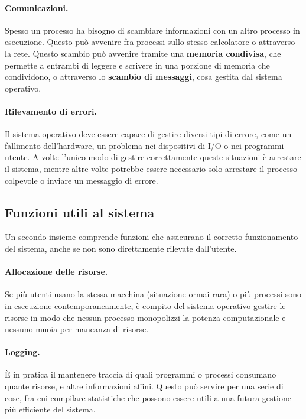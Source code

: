         \paragraph{Comunicazioni.} Spesso un processo ha bisogno di scambiare informazioni con un altro processo in esecuzione. Questo può avvenire fra processi sullo stesso calcolatore o attraverso la rete. Questo scambio può avvenire tramite una \textbf{memoria condivisa}, che permette a entrambi di leggere e scrivere in una porzione di memoria che condividono, o attraverso lo \textbf{scambio di messaggi}, cosa gestita dal sistema operativo.
        
        \paragraph{Rilevamento di errori.} Il sistema operativo deve essere capace di gestire diversi tipi di errore, come un fallimento dell'hardware, un problema nei dispositivi di I/O o nei programmi utente. A volte l'unico modo di gestire correttamente queste situazioni è arrestare il sistema, mentre altre volte potrebbe essere necessario solo arrestare il processo colpevole o inviare un messaggio di errore.
        
    \subsection{Funzioni utili al sistema}
        Un secondo insieme comprende funzioni che assicurano il corretto funzionamento del sistema, anche se non sono direttamente rilevate dall'utente.
        
        \paragraph{Allocazione delle risorse.} Se più utenti usano la stessa macchina (situazione ormai rara) o più processi sono in esecuzione contemporaneamente, è compito del sistema operativo gestire le risorse in modo che nessun processo monopolizzi la potenza computazionale e nessuno muoia per mancanza di risorse.
        
        \paragraph{Logging.} È in pratica il mantenere traccia di quali programmi o processi consumano quante risorse, e altre informazioni affini. Questo può servire per una serie di cose, fra cui compilare statistiche che possono essere utili a una futura gestione più efficiente del sistema.
        
